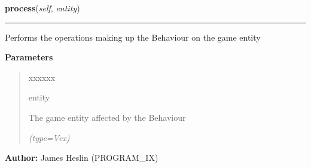     \label{pystroke:behaviour:Behaviour:process}

    \vspace{0.5ex}

\hspace{.8\funcindent}\begin{boxedminipage}{\funcwidth}

    \raggedright \textbf{process}(\textit{self}, \textit{entity})

    \vspace{-1.5ex}

    \rule{\textwidth}{0.5\fboxrule}
\setlength{\parskip}{2ex}
    Performs the operations making up the Behaviour on the game entity

\setlength{\parskip}{1ex}
      \textbf{Parameters}
      \vspace{-1ex}

      \begin{quote}
        \begin{Ventry}{xxxxxx}

          \item[entity]

          The game entity affected by the Behaviour

            {\it (type=Vex)}

        \end{Ventry}

      \end{quote}

\textbf{Author:} James Heslin (PROGRAM\_IX)



    \end{boxedminipage}

